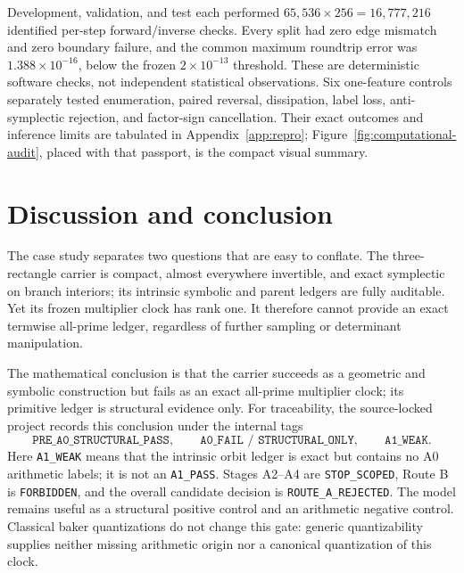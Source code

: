 \documentclass[11pt]{article}
\theoremstyle{definition}
\theoremstyle{remark}
\newcommand{\RouteAZero}{\texttt{A0\_FAIL / STRUCTURAL\_ONLY}}
\newcommand{\RouteAOne}{\texttt{A1\_WEAK}}
\begin{document}
Development, validation, and test each performed
\(65{,}536\times256=16{,}777{,}216\) identified per-step forward/inverse
checks.  Every split had zero edge mismatch and zero boundary failure, and the
common maximum roundtrip error was \(1.388\times10^{-16}\), below the frozen
\(2\times10^{-13}\) threshold.  These are deterministic software checks, not
independent statistical observations.  Six one-feature controls separately
tested enumeration, paired reversal, dissipation, label loss,
anti-symplectic rejection, and factor-sign cancellation.  Their exact outcomes
and inference limits are tabulated in Appendix~\ref{app:repro};
Figure~\ref{fig:computational-audit}, placed with that passport, is the
compact visual summary.

\section{Discussion and conclusion}
\label{sec:discussion}

The case study separates two questions that are easy to conflate.  The
three-rectangle carrier is compact, almost everywhere invertible, and exact
symplectic on branch interiors; its intrinsic symbolic and parent ledgers are
fully auditable.  Yet its frozen multiplier clock has rank one.  It therefore
cannot provide an exact termwise all-prime ledger, regardless of further
sampling or determinant manipulation.

The mathematical conclusion is that the carrier succeeds as a geometric and
symbolic construction but fails as an exact all-prime multiplier clock; its
primitive ledger is structural evidence only.  For traceability, the
source-locked project records this conclusion under the internal tags
\begin{equation*}
 \texttt{PRE\_A0\_STRUCTURAL\_PASS},\qquad
 \RouteAZero{},\qquad \RouteAOne{}.
\end{equation*}
Here \RouteAOne{} means that the intrinsic orbit ledger is exact but contains
no A0 arithmetic labels; it is not an \texttt{A1\_PASS}.  Stages A2--A4 are
\texttt{STOP\_SCOPED}, Route B is \texttt{FORBIDDEN}, and the overall
candidate decision is \texttt{ROUTE\_A\_REJECTED}.  The model remains useful
as a structural positive control and an arithmetic negative control.
Classical baker quantizations \citep{balazs1989quantized,saraceno1990classical}
do not change this gate: generic quantizability supplies neither missing
arithmetic origin nor a canonical quantization of this clock.
\end{document}
